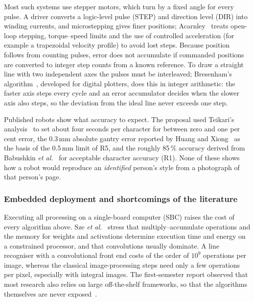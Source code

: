 Most such systems use stepper motors, which turn by a fixed angle for every pulse. A driver converts a logic-level pulse (STEP) and direction level (DIR) into winding currents, and microstepping gives finer positions; Acarnley~\cite{acarnley2002} treats open-loop stepping, torque--speed limits and the use of controlled acceleration (for example a trapezoidal velocity profile) to avoid lost steps. Because position follows from counting pulses, error does not accumulate if commanded positions are converted to integer step counts from a known reference. To draw a straight line with two independent axes the pulses must be interleaved; Bresenham's algorithm~\cite{bresenham1965}, developed for digital plotters, does this in integer arithmetic: the faster axis steps every cycle and an error accumulator decides when the slower axis also steps, so the deviation from the ideal line never exceeds one step.

Published robots show what accuracy to expect. The proposal used Teikari's analysis~\cite{teikari2016} to set about four seconds per character for between zero and one per cent error, the 0.3\,mm absolute gantry error reported by Huang and Xiong~\cite{huang2024} as the basis of the 0.5\,mm limit of R5, and the roughly 85\,\% accuracy derived from Babushkin \emph{et al.}~\cite{babushkin2025} for acceptable character accuracy (R1). None of these shows how a robot would reproduce an \emph{identified} person's style from a photograph of that person's page.

\subsubsection{Embedded deployment and shortcomings of the literature}
\label{sec:lit-embedded}

Executing all processing on a single-board computer (SBC) raises the cost of every algorithm above. Sze \emph{et al.}~\cite{sze2017} stress that multiply--accumulate operations and the memory for weights and activations determine execution time and energy on a constrained processor, and that convolutions usually dominate. A line recogniser with a convolutional front end costs of the order of $10^{9}$ operations per image, whereas the classical image-processing steps need only a few operations per pixel, especially with integral images. The first-semester report observed that most research also relies on large off-the-shelf frameworks, so that the algorithms themselves are never exposed~\cite{chen2023}.

